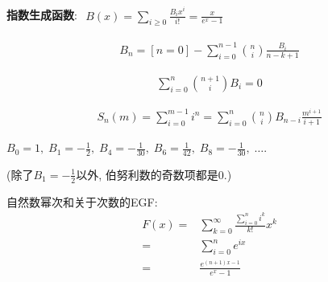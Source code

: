 \textbf{指数生成函数}: $\begin{aligned}B(x)=\sum_{i\ge 0}\frac{B_i x^i}{i!}=\frac x{e^x-1}\end{aligned}$

$$ \begin{aligned}B_n=[n=0]-\sum_{i=0}^{n-1}{n\choose i}\frac{B_i}{n-k+1}\end{aligned} $$

$$ \begin{aligned}\sum_{i=0}^n{n+1\choose i}B_i=0\end{aligned} $$

$$ \begin{aligned}S_n(m)=\sum_{i=0}^{m-1}i^n=\sum_{i=0}^n{n\choose i}B_{n-i}\frac{m^{i+1}}{i+1}\end{aligned} $$

$ B_0 = 1,\; B_1 = -\frac 1 2,\; B_4 = -\frac 1 {30},\; B_6 = \frac 1 {42},\; B_8 = -\frac 1{30},\; \dots$.

(除了$B_1 = -\frac 1 2$以外, 伯努利数的奇数项都是$0$.)

自然数幂次和关于次数的EGF:
$$ \begin{aligned} F(x)=&\sum_{k=0}^\infty \frac{\sum_{i=0}^n i^k}{k!}x^k\\ =&\sum_{i=0}^n e^{ix}\\ =&\frac{e^{(n+1)x-1}}{e^x-1} \end{aligned} $$